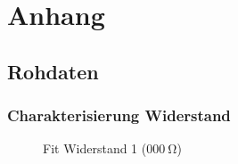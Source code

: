 \documentclass[12pt,twoside,a4paper]{scrartcl}
\begin{document}
\section{Anhang}
	\subsection{Rohdaten}
		\subsubsection{Charakterisierung Widerstand}
		\label{Daten::Widerstand}

			\begin{figure}[H]
				\centering
				\begin{minipage}{0.4 \textwidth}
				\caption{Fit Widerstand 1 ($\SI{000}{\ohm}$)}
				\end{minipage}
				\begin{minipage}{0.4 \textwidth}

\end{minipage}
\end{figure}
\end{document}
